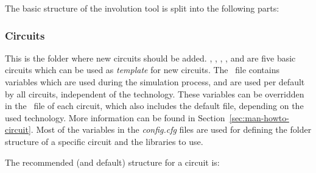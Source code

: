 The basic structure of the involution tool is split into the following parts: 


\subsubsection{Circuits}\label{sec:man-struc-circuits}

This is the folder where new circuits should be added. , 
, , ,  and  are 
five basic circuits which can be used as \emph{template} for new circuits. The 
\configcfg\ file contains variables which are used during the simulation 
process, and are used per default by all circuits, independent of the 
technology. 
These variables can be overridden in the \configcfg\ file of each circuit, 
which also includes the default  file, depending on the used 
technology.
More information can be found in Section~\ref{sec:man-howto-circuit}. Most of 
the variables in the \emph{config\*.cfg} files are used for defining the folder 
structure of a specific circuit and the libraries to use.

The recommended (and default) structure for a circuit is:


